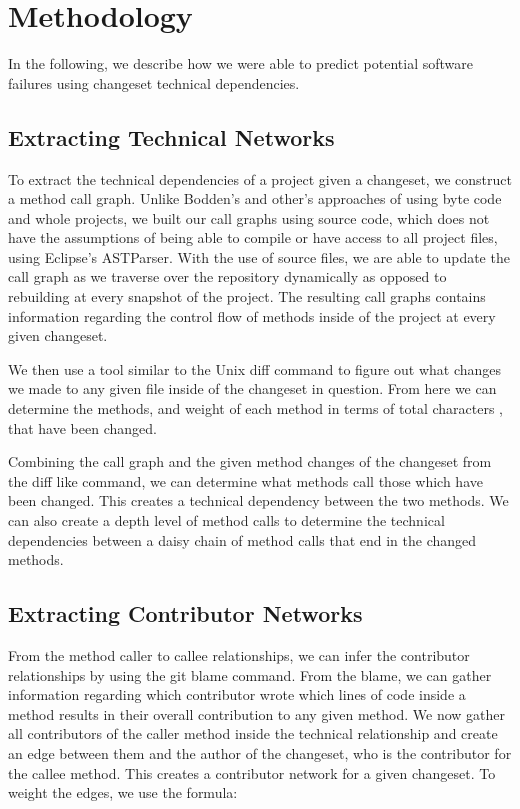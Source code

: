 \documentclass[conference]{IEEEtran}
\begin{document}
\section{Methodology}
In the following, we describe how we were able to predict potential software failures using changeset
technical dependencies.

\subsection{Extracting Technical Networks}
To extract the technical dependencies of a project given a changeset, we construct a method
call graph. Unlike  Bodden's \cite{Bodden:2003:HVJ} and other's approaches of using byte code
and whole projects, we built our call graphs using source code, which does not have the assumptions
of being able to compile or have access to all project files, using Eclipse's ASTParser. 
With the use of source files, we are able
to update the call graph as we traverse over the repository dynamically as opposed to rebuilding
at every snapshot of the project. The resulting call graphs contains information regarding the control
flow of methods inside of the project at every given changeset.

We then use a tool similar to the Unix diff command to figure out what changes we made to any given
file inside of the changeset in question. From here we can determine the methods, and weight
of each method in terms of total characters , that have been changed.

Combining the call graph and the given method changes of the changeset from the diff like command,
we can determine what methods call those which have been changed. This creates a technical
dependency between the two methods. We can also create a depth level of method calls to determine
the technical dependencies between a daisy chain of method calls that end in the changed methods.

\subsection{Extracting Contributor Networks}
From the method caller to callee relationships, we can infer the contributor relationships by using
the git blame command. From the blame, we can gather information regarding which contributor 
wrote which lines of code inside a method results in their overall contribution to any given method.
We now gather all contributors of the caller method inside the technical relationship and create an
edge between them and the author of the changeset, who is the contributor for the callee method.
This creates a contributor network for a given changeset. To weight the edges, we use the formula:
\end{document}
